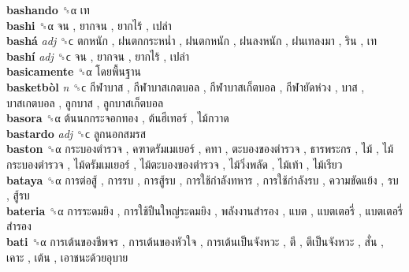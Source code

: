 \textbf{bashando} ␝α   เท   \\
\textbf{bashi} ␝α   จน ,  ยากจน ,  ยากไร้ ,  เปล่า   \\
\textbf{bashá} \emph{adj}  ␝ϲ   ตกหนัก ,  ฝนตกกระหน่ำ ,  ฝนตกหนัก ,  ฝนลงหนัก ,  ฝนเทลงมา ,  ริน ,  เท   \\
\textbf{bashí} \emph{adj}  ␝ϲ   จน ,  ยากจน ,  ยากไร้ ,  เปล่า   \\
\textbf{basicamente} ␝α   โดยพื้นฐาน   \\
\textbf{basketbòl} \emph{n}  ␝ϲ   กีฬาบาส ,  กีฬาบาสเกตบอล ,  กีฬาบาสเก็ตบอล ,  กีฬายัดห่วง ,  บาส ,  บาสเกตบอล ,  ลูกบาส ,  ลูกบาสเก็ตบอล   \\
\textbf{basora} ␝α   ต้นนกกระจอกทอง ,  ต้นฮีเทอร์ ,  ไม้กวาด   \\
\textbf{bastardo} \emph{adj}  ␝ϲ   ลูกนอกสมรส   \\
\textbf{baston} ␝α   กระบองตำรวจ ,  คฑาดรัมเมเยอร์ ,  คทา ,  ตะบองของตำรวจ ,  ธารพระกร ,  ไม้ ,  ไม้กระบองตำรวจ ,  ไม้ดรัมเมเยอร์ ,  ไม้ตะบองของตำรวจ ,  ไม้วิ่งพลัด ,  ไม้เท้า ,  ไม้เรียว   \\
\textbf{bataya} ␝α   การต่อสู้ ,  การรบ ,  การสู้รบ ,  การใช้กำลังทหาร ,  การใช้กำลังรบ ,  ความขัดแย้ง ,  รบ ,  สู้รบ   \\
\textbf{bateria} ␝α   การระดมยิง ,  การใช้ปืนใหญ่ระดมยิง ,  พลังงานสำรอง ,  แบต ,  แบตเตอรี่ ,  แบตเตอรี่สำรอง   \\
\textbf{bati} ␝α   การเต้นของชีพจร ,  การเต้นของหัวใจ ,  การเต้นเป็นจังหวะ ,  ตี ,  ตีเป็นจังหวะ ,  สั่น ,  เคาะ ,  เต้น ,  เอาชนะด้วยอุบาย   \\
